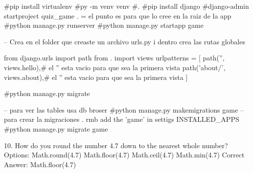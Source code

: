 #pip install virtualenv
#py -m venv venv
#.\venv\Scripts\Activate
#pip install django
#django-admin startproject quiz_game . = el punto es para que lo cree en la raiz de la app
#python manage.py runserver
#python manage.py startapp game

-- Crea en el folder que creaste un archivo urls.py i dentro crea las rutas globales 

from django.urls import path
from . import views
urlpatterns = [
    path('', views.hello),# el  '' esta vacio para que sea la primera vista 
    path('about/', views.about),# el  '' esta vacio para que sea la primera vista 
]

#python manage.py migrate

-- para ver las tables usa db broser 
#python manage.py makemigrations game  -- para crear la migraciones . rmb add the 'game' in settigs INSTALLED_APPS
#python manage.py migrate game  
















10. How do you round the number 4.7 down to the nearest whole number?
Options:
Math.round(4.7)
Math.floor(4.7)
Math.ceil(4.7)
Math.min(4.7)
Correct Answer: Math.floor(4.7)
